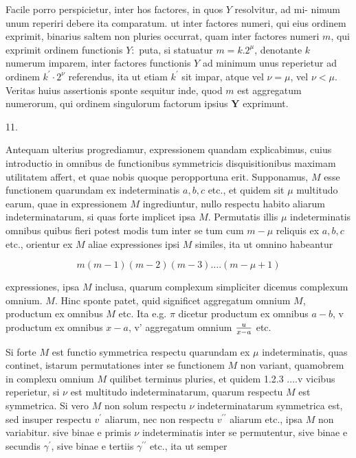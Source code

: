 \documentclass[twoside,12pt, showframe]{memoir}
\let\oldfrac\frac
\def\frac#1#2{\mathchoice{\tfrac{#1}{#2}}{\oldfrac{#1}{#2}}{\genfrac{}{}{}{2}{#1}{#2\mathstrut}}{\genfrac{}{}{}{3}{#1}{#2\mathstrut}}}
\begin{document}
Facile porro perspicietur, inter hos factores, in quos \(Y\) resolvitur, ad mi-
nimum unum reperiri debere ita comparatum. ut inter factores numeri, qui eius ordinem exprimit, binarius saltem non pluries occurrat, quam inter factores numeri \(m\), qui exprimit ordinem functionis \(Y:\) puta, si statuatur \(m=k .2^{\mu}\), denotante \(k\) numerum imparem, inter factores functionis \(Y\) ad minimum unus reperietur ad ordinem \(k^{\prime} \cdot 2^{\nu}\) referendus, ita ut etiam \(k^{\prime}\) sit impar, atque vel \(\nu=\mu\), vel \(\nu<\mu . \quad\) Veritas huius assertionis sponte sequitur inde, quod \(m\) est aggregatum numerorum, qui ordinem singulorum factorum ipsius \(\boldsymbol{Y}\) exprimunt.

11.

Antequam ulterius progrediamur, expressionem quandam explicabimus, cuius introductio in omnibus de functionibus symmetricis disquisitionibus maximam utilitatem affert, et quae nobis quoque peropportuna erit. Supponamus, \(M\) esse functionem quarundam ex indeterminatis \(a, b, c\) etc., et quidem sit \(\mu\) multitudo earum, quae in expressionem \(M\) ingrediuntur, nullo respectu habito aliarum indeterminatarum, si quas forte implicet ipsa \(M\). Permutatis illis \(\mu\) indeterminatis omnibus quibus fieri potest modis tum inter se tum cum \(m-\mu\) reliquis ex \(a, b, c\) etc., orientur ex \(M\) aliae expressiones ipsi \(M\) similes, ita ut omnino habeantur

\[
m(m-1)(m-2)(m-3) \ldots .(m-\mu+1)
\]

expressiones, ipsa \(M\) inclusa, quarum complexum simpliciter dicemus complexum omnium. \(M\). Hinc sponte patet, quid significet aggregatum omnium \(M\), productum ex omnibus \(M\) etc. Ita e.g. \(\pi\) dicetur productum ex omnibus \(a-b\), v productum ex omnibus \(x-a\), v' aggregatum omnium \(\frac{u}{x-a}\) etc.

Si forte \(M\) est functio symmetrica respectu quarundam ex \(\mu\) indeterminatis, quas continet, istarum permutationes inter se functionem \(M\) non variant, quamobrem in complexu omnium \(M\) quilibet terminus pluries, et quidem 1.2.3 ....v vicibus reperietur, si \(\nu\) est multitudo indeterminatarum, quarum respectu \(M\) est symmetrica. Si vero \(M\) non solum respectu \(\nu\) indeterminatarum symmetrica est, sed insuper respectu \(v^{\prime}\) aliarum, nec non respectu \(v^{\prime \prime}\) aliarum etc., ipsa \(M\) non variabitur. sive binae e primis \(\nu\) indeterminatis inter se permutentur, sive binae e secundis \(\gamma^{\prime}\), sive binae e tertiis \(\gamma^{\prime \prime}\) etc., ita ut semper
\end{document}
